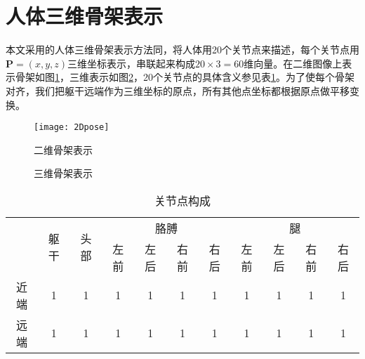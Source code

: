 \section{人体三维骨架表示}
\label{sec:skeleton}

本文采用的人体三维骨架表示方法同\cite{bo2010twin}，将人体用20个关节点来描述，每个关节点用$\mathbf{P}=(x,y,z)$三维坐标表示，串联起来构成$20\times3=60$维向量。在二维图像上表示骨架如图\ref{fig:2Ddemo}，三维表示如图\ref{fig:3Ddemo}，20个关节点的具体含义参见表\ref{tab:20}。为了使每个骨架对齐，我们把躯干远端作为三维坐标的原点，所有其他点坐标都根据原点做平移变换。

\begin{figure}[htbp]
  \centering
  \texttt{[image: 2Dpose]}\\
  \caption{二维骨架表示}\label{fig:2Ddemo}
\end{figure}

\begin{figure}[htbp]
  \centering
  \subcaptionbox{}{\texttt{[image: 3D\_1]}\hspace{1cm}}
  \subcaptionbox{}{\texttt{[image: 3D\_2]}\hspace{1cm}}
  \subcaptionbox{}{\texttt{[image: 3D\_3]}}
  \caption{三维骨架表示}\label{fig:3Ddemo}
\end{figure}

\begin{table}[htbp]
  \centering
  \begin{tabular}{ccccccccccc}
  \toprule[1.5pt]
    & \multirow{2}{4em}{躯干}  & \multirow{2}{4em}{头部}  & \multicolumn{4}{c}{胳膊} & \multicolumn{4}{c}{腿}\\
    & & & 左前 & 左后 & 右前 & 右后 & 左前 & 左后 & 右前 & 右后 \\\midrule[1pt]
   近端 & 1 & 1 & 1 & 1 & 1 & 1 & 1 & 1 & 1 & 1 \\
   远端 & 1 & 1 & 1 & 1 & 1 & 1 & 1 & 1 & 1 & 1 \\
   \bottomrule[1.5pt]
  \end{tabular}
  \caption{关节点构成}\label{tab:20}
\end{table}

